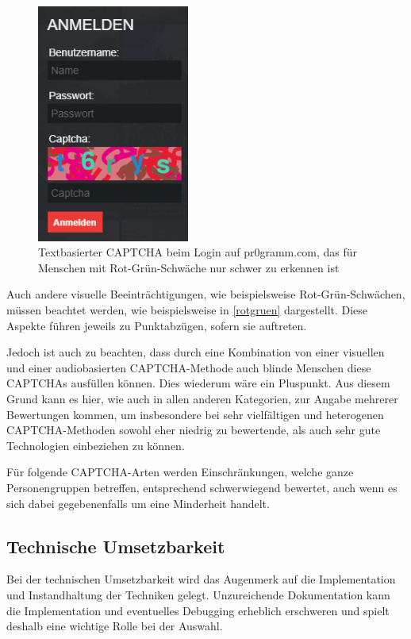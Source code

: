 \begin{figure}[h!]
    \centering
    \includegraphics[width=5cm]{gfx/mygraphics/pr0grammcaptcha.png}
    \caption{Textbasierter CAPTCHA beim Login auf pr$0$gramm.com, das für Menschen mit Rot-Grün-Schwäche nur schwer zu erkennen ist}
    \label{rotgruen}
\end{figure}

\pagebreak

Auch andere visuelle Beeinträchtigungen, wie beispielsweise Rot-Grün-Schwächen, müssen beachtet werden,
wie beispielsweise in \autoref{rotgruen} dargestellt.
Diese Aspekte führen jeweils zu Punkt\-abzügen, sofern sie auftreten.

Jedoch ist auch zu beachten, dass durch eine Kombination von einer visuellen 
und einer audiobasierten CAPTCHA-Methode auch blinde Menschen diese CAPTCHAs ausfüllen können. 
Dies wiederum wäre ein Pluspunkt. 
Aus diesem Grund kann es hier, wie auch in allen anderen Kategorien, zur Angabe mehrerer Bewertungen kommen,
um insbesondere bei sehr vielfältigen und heterogenen CAPTCHA-Methoden sowohl eher niedrig zu bewertende, 
als auch sehr gute Technologien einbeziehen zu können.

Für folgende CAPTCHA-Arten werden Einschränkungen, welche ganze Personengruppen betreffen, entsprechend schwerwiegend bewertet,
auch wenn es sich dabei gegebenenfalls um eine Minderheit handelt.

\subsection{Technische Umsetzbarkeit}
\label{ch:matrix:aspekte:tu}

Bei der technischen Umsetzbarkeit wird das Augenmerk auf die Implementation und Instandhaltung der Techniken gelegt.
Unzureichende Dokumentation kann die Implementation und eventuelles Debugging erheblich erschweren
und spielt deshalb eine wichtige Rolle bei der Auswahl.

